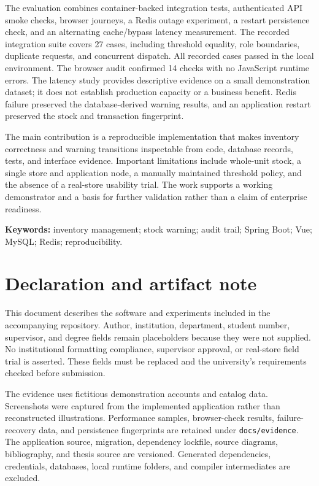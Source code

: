 \documentclass[11pt,a4paper,oneside]{report}
\begin{document}
The evaluation combines container-backed integration tests, authenticated API smoke checks, browser journeys, a Redis outage experiment, a restart persistence check, and an alternating cache/bypass latency measurement. The recorded integration suite covers 27 cases, including threshold equality, role boundaries, duplicate requests, and concurrent dispatch. All recorded cases passed in the local environment. The browser audit confirmed 14 checks with no JavaScript runtime errors. The latency study provides descriptive evidence on a small demonstration dataset; it does not establish production capacity or a business benefit. Redis failure preserved the database-derived warning results, and an application restart preserved the stock and transaction fingerprint.

The main contribution is a reproducible implementation that makes inventory correctness and warning transitions inspectable from code, database records, tests, and interface evidence. Important limitations include whole-unit stock, a single store and application node, a manually maintained threshold policy, and the absence of a real-store usability trial. The work supports a working demonstrator and a basis for further validation rather than a claim of enterprise readiness.

\noindent\textbf{Keywords:} inventory management; stock warning; audit trail; Spring Boot; Vue; MySQL; Redis; reproducibility.
\chapter*{Declaration and artifact note}
This document describes the software and experiments included in the accompanying repository. Author, institution, department, student number, supervisor, and degree fields remain placeholders because they were not supplied. No institutional formatting compliance, supervisor approval, or real-store field trial is asserted. These fields must be replaced and the university's requirements checked before submission.

The evidence uses fictitious demonstration accounts and catalog data. Screenshots were captured from the implemented application rather than reconstructed illustrations. Performance samples, browser-check results, failure-recovery data, and persistence fingerprints are retained under \texttt{docs/evidence}. The application source, migration, dependency lockfile, source diagrams, bibliography, and thesis source are versioned. Generated dependencies, credentials, databases, local runtime folders, and compiler intermediates are excluded.
\end{document}
